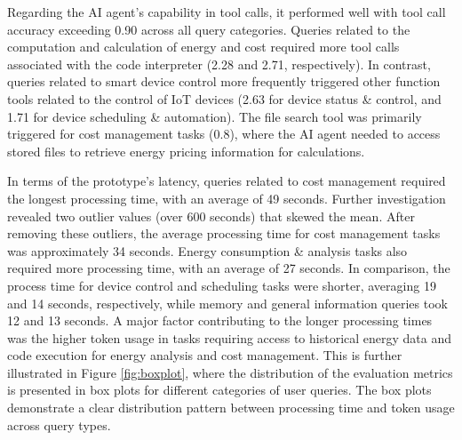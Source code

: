 \documentclass[final,3p,times]{elsarticle}
\begin{document}
Regarding the AI agent’s capability in tool calls, it performed well with tool call accuracy exceeding 0.90 across all query categories. Queries related to the computation and calculation of energy and cost required more tool calls associated with the code interpreter (2.28 and 2.71, respectively). In contrast, queries related to smart device control more frequently triggered other function tools related to the control of IoT devices (2.63 for device status \& control, and 1.71 for device scheduling \& automation). The file search tool was primarily triggered for cost management tasks (0.8), where the AI agent needed to access stored files to retrieve energy pricing information for calculations.

In terms of the prototype’s latency, queries related to cost management required the longest processing time, with an average of 49 seconds. Further investigation revealed two outlier values (over 600 seconds) that skewed the mean. After removing these outliers, the average processing time for cost management tasks was approximately 34 seconds. Energy consumption \& analysis tasks also required more processing time, with an average of 27 seconds. In comparison, the process time for device control and scheduling tasks were shorter, averaging 19 and 14 seconds, respectively, while memory and general information queries took 12 and 13 seconds. A major factor contributing to the longer processing times was the higher token usage in tasks requiring access to historical energy data and code execution for energy analysis and cost management. This is further illustrated in Figure \ref{fig:boxplot}, where the distribution of the evaluation metrics is presented in box plots for different categories of user queries. The box plots demonstrate a clear distribution pattern between processing time and token usage across query types. 
\end{document}

